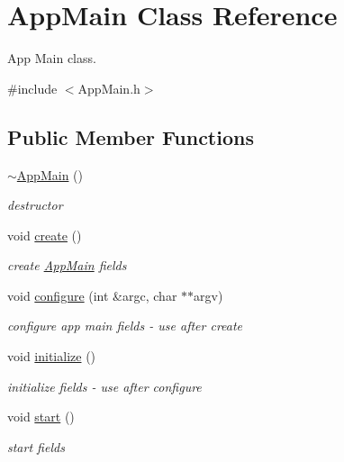\hypertarget{class_app_main}{\section{App\+Main Class Reference}
\label{class_app_main}
}


App Main class.  




{\ttfamily \#include $<$App\+Main.\+h$>$}

\subsection*{Public Member Functions}
\begin{DoxyCompactItemize}
\item 
\hyperlink{class_app_main_a177f19ad5d0aa890240149cf69ab7a99}{$\sim$\+App\+Main} ()
\begin{DoxyCompactList}\small\item\em destructor \end{DoxyCompactList}\item 
void \hyperlink{class_app_main_ad1c2c6a74bc632badcef49b83ea7fe2d}{create} ()
\begin{DoxyCompactList}\small\item\em create \hyperlink{class_app_main}{App\+Main} fields \end{DoxyCompactList}\item 
void \hyperlink{class_app_main_ab406ce0928c9f4b6795d4d1ec73ec4b0}{configure} (int \&argc, char $\ast$$\ast$argv)
\begin{DoxyCompactList}\small\item\em configure app main fields -\/ use after create \end{DoxyCompactList}\item 
void \hyperlink{class_app_main_a3d5604ff5d90aed9ec2c8a9e845adedc}{initialize} ()
\begin{DoxyCompactList}\small\item\em initialize fields -\/ use after configure \end{DoxyCompactList}\item 
void \hyperlink{class_app_main_a33c294d8b4636602703124e629bff59b}{start} ()
\begin{DoxyCompactList}\small\item\em start fields \end{DoxyCompactList}\end{DoxyCompactItemize}


